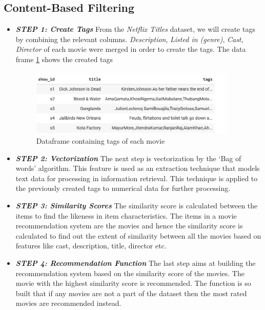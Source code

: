 \documentclass[a4paper,10pt]{article}
\begin{document}
\subsection{Content-Based Filtering}
\begin{itemize}
    \item  \textbf{\textit{STEP 1: Create Tags}} 
    From the \textit{Netflix Titles} dataset, we will  create tags by combining the relevant columns. \textit{Description}, \textit{Listed in (genre)}, \textit{Cast}, \textit{Director} of each movie were merged in order to create the tags. The data frame \ref{tags} shows the created tags

\begin{figure}[H]
        
        \centering
        \includegraphics[height=3.2cm]{figures/tags.png}
        \caption{Dataframe containing tags of each movie}
        \label{tags}
\end{figure}


    \item  \textbf{\textit{STEP 2: Vectorization}}
    The next step is vectorization by the ‘Bag of words’ algorithm. This feature is used as an extraction technique that models text data for processing in information retrieval. This technique is applied to the previously created tags to numerical data for further processing.

    \item  \textbf{\textit{STEP 3: Similarity Scores}}
    The similarity score is calculated between the items to find the likeness in item characteristics. The items in a movie recommendation system are the movies and hence the similarity score is calculated to find out the extent of similarity between all the movies based on features like cast, description, title, director etc.

    \item  \textbf{\textit{STEP 4: Recommendation Function}}
    The last step aims at building the recommendation system based on the similarity score of the movies. The movie with the highest similarity score is recommended. The function is so built that if any movies are not a part of the dataset then the most rated movies are recommended instead.


\end{itemize}
\end{document}
